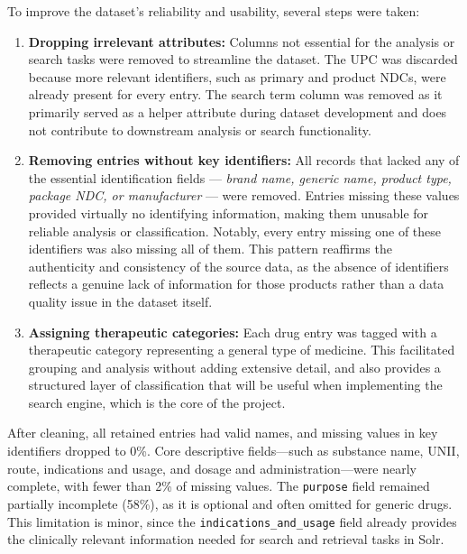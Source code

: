 To improve the dataset's reliability and usability, several steps were taken:

\begin{enumerate}
  \item \textbf{Dropping irrelevant attributes:} Columns not essential for the analysis or search tasks were removed to streamline the dataset. The UPC was discarded because more relevant identifiers, such as primary and product NDCs, were already present for every entry. The search term column was removed as it primarily served as a helper attribute during dataset development and does not contribute to downstream analysis or search functionality.


  \item \textbf{Removing entries without key identifiers:} All records that lacked any of the essential identification fields --- \textit{brand name, generic name, product type, package NDC, or manufacturer} --- were removed. Entries missing these values provided virtually no identifying information, making them unusable for reliable analysis or classification. Notably, every entry missing one of these identifiers was also missing all of them. This pattern reaffirms the authenticity and consistency of the source data, as the absence of identifiers reflects a genuine lack of information for those products rather than a data quality issue in the dataset itself.



  \item \textbf{Assigning therapeutic categories:} Each drug entry was tagged with a therapeutic category representing a general type of medicine. This facilitated grouping and analysis without adding extensive detail, and also provides a structured layer of classification that will be useful when implementing the search engine, which is the core of the project.
\end{enumerate}

After cleaning, all retained entries had valid names, and missing values in key identifiers dropped to 0\%. Core descriptive fields—such as substance name, UNII, route, indications and usage, and dosage and administration—were nearly complete, with fewer than 2\% of missing values. The \texttt{purpose} field remained partially incomplete (58\%), as it is optional and often omitted for generic drugs. This limitation is minor, since the \texttt{indications\_and\_usage} field already provides the clinically relevant information needed for search and retrieval tasks in Solr.

